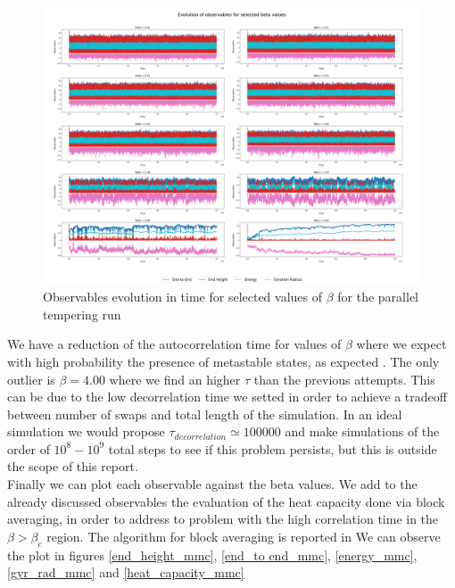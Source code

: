 \begin{figure}[H]
    \centering
    \includegraphics[width=\textwidth]{FIG/exercise_6_images/observables_mmc_polymer_summary.png}
    \caption{Observables evolution in time for selected values of $\beta$ for the parallel tempering run}
    \label{lec6:polymer_evolution_mmc}
\end{figure}

We have a reduction of the autocorrelation time for values of $\beta$ where we expect with high probability the presence of metastable states, as expected \cite{OrlandoBrando}. The only outlier is $\beta = 4.00$ where we 
find an higher $\tau$ than the previous attempts. This can be due to the low decorrelation time we setted in order to achieve a tradeoff between number of swaps and total length of the simulation.
In an ideal simulation we would propose $\tau_{decorrelation} \simeq 100000$ and make simulations of the order of $10^8-10^9$ total steps to see if this problem persists, but this is outside the scope of this report. \\
Finally we can plot each observable against the beta values. We add to the already discussed observables the evaluation of the heat capacity done via block averaging, in order 
to address to problem with the high correlation time in the $\beta > \beta_c$ region. The algorithm for block averaging is reported in  
We can observe the plot in figures \ref{end_height_mmc}, \ref{end_to end_mmc}, \ref{energy_mmc}, \ref{gyr_rad_mmc} and \ref{heat_capacity_mmc}

